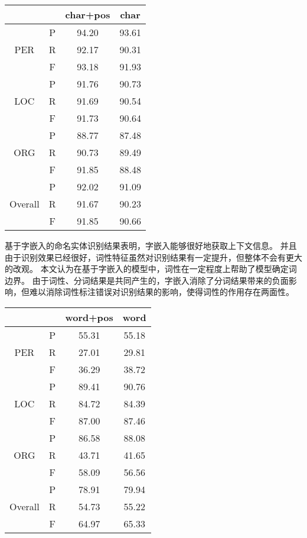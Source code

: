 \begin{table}[H]
    \centering
    \begin{tabular}{cccc}
        \toprule
        & & char+pos & char\\
        \midrule
        \multirow{3}{*}{PER} & P & 94.20 & 93.61\\
        & R & 92.17 & 90.31\\
        & F & 93.18 & 91.93 \\
        \midrule
        \multirow{3}{*}{LOC} & P & 91.76 & 90.73\\
        & R & 91.69 & 90.54 \\
        & F & 91.73 & 90.64\\
        \midrule
        \multirow{3}{*}{ORG} & P & 88.77 & 87.48\\
        & R & 90.73 & 89.49\\
        & F & 91.85 & 88.48\\
        \midrule
        \multirow{3}{*}{Overall} & P & 92.02 & 91.09\\
        & R & 91.67 & 90.23\\
        & F & 91.85 & 90.66\\
        \bottomrule
    \end{tabular}
    \label{tab:char-comparison}
\end{table}
基于字嵌入的命名实体识别结果表明，字嵌入能够很好地获取上下文信息。
并且由于识别效果已经很好，词性特征虽然对识别结果有一定提升，但整体不会有更大的改观。
本文认为在基于字嵌入的模型中，词性在一定程度上帮助了模型确定词边界。
由于词性、分词结果是共同产生的，字嵌入消除了分词结果带来的负面影响，但难以消除词性标注错误对识别结果的影响，使得词性的作用存在两面性。

\begin{table}[H]
    \centering
    \begin{tabular}{cccc}
        \toprule
        & & word+pos & word\\
        \midrule
        \multirow{3}{*}{PER} & P & 55.31 & 55.18\\
        & R & 27.01 & 29.81\\
        & F & 36.29 & 38.72 \\
        \midrule
        \multirow{3}{*}{LOC} & P & 89.41 & 90.76\\
        & R & 84.72 & 84.39 \\
        & F & 87.00 & 87.46\\
        \midrule
        \multirow{3}{*}{ORG} & P & 86.58 & 88.08\\
        & R & 43.71 & 41.65\\
        & F & 58.09 & 56.56\\
        \midrule
        \multirow{3}{*}{Overall} & P & 78.91 & 79.94\\
        & R & 54.73 & 55.22\\
        & F & 64.97  & 65.33\\
        \bottomrule
    \end{tabular}
    \label{tab:word-comparison}
\end{table}

